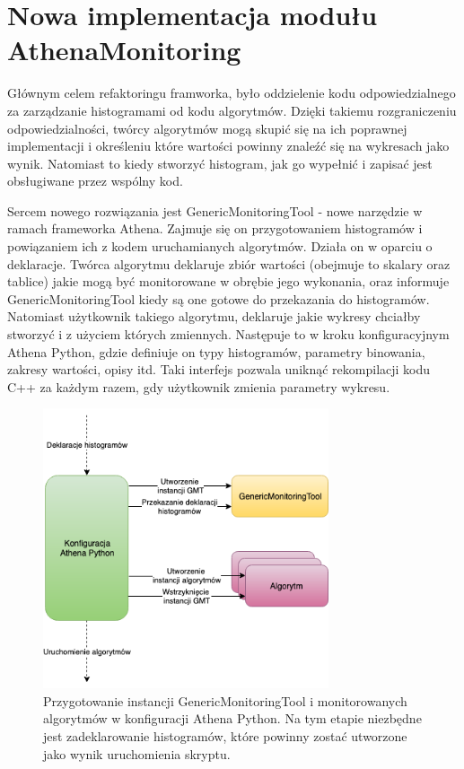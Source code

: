\section{Nowa implementacja modułu AthenaMonitoring}
Głównym celem refaktoringu framworka, było oddzielenie kodu odpowiedzialnego za zarządzanie histogramami od kodu algorytmów. 
Dzięki takiemu rozgraniczeniu odpowiedzialności, twórcy algorytmów mogą skupić się na ich poprawnej implementacji i określeniu które wartości powinny znaleźć się na wykresach jako wynik. 
Natomiast to kiedy stworzyć histogram, jak go wypełnić i zapisać jest obsługiwane przez wspólny kod. 

Sercem nowego rozwiązania jest GenericMonitoringTool - nowe narzędzie w ramach frameworka Athena.
Zajmuje się on przygotowaniem histogramów i powiązaniem ich z kodem uruchamianych algorytmów. 
Działa on w oparciu o deklaracje.
Twórca algorytmu deklaruje zbiór wartości (obejmuje to skalary oraz tablice) jakie mogą być monitorowane w obrębie jego wykonania, oraz informuje GenericMonitoringTool kiedy są one gotowe do przekazania do histogramów.
Natomiast użytkownik takiego algorytmu, deklaruje jakie wykresy chciałby stworzyć i z użyciem których zmiennych. 
Następuje to w kroku konfiguracyjnym Athena Python, gdzie definiuje on typy histogramów, parametry binowania, zakresy wartości, opisy itd. 
Taki interfejs pozwala uniknąć rekompilacji kodu C++ za każdym razem, gdy użytkownik zmienia parametry wykresu. 

\begin{figure}[!ht]
\centering
\includegraphics[width=0.75\textwidth]{img/algo_init.png}
\caption{
Przygotowanie instancji GenericMonitoringTool i monitorowanych algorytmów w konfiguracji Athena Python. Na tym etapie niezbędne jest zadeklarowanie histogramów, które powinny zostać utworzone jako wynik uruchomienia skryptu.
}
\label{fig:athena:algoInit}
\end{figure}

